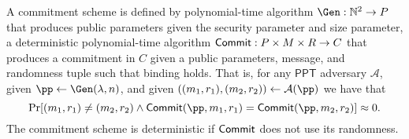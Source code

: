 \begin{definition}\label{def:commitment}
    A commitment scheme is defined by polynomial-time algorithm
    $\Gen : \mathbb{N}^2 \to P$
    that produces public parameters given the security parameter and size parameter, 
    a deterministic polynomial-time algorithm
    $\mathsf{Commit} : P \times M \times R \to C$
    that produces a commitment in $C$ given a public parameters, message, and randomness tuple
    such that 
    binding holds.
    That is, 
    for any $\mathsf{PPT}$ adversary $\mathcal{A}$,
    given
    $\pp \gets \Gen(\lambda, n)$,
    and given $((m_1, r_1), (m_2, r_2)) \gets \mathcal{A}(\pp)$
    we have that
    \[
        \Pr[(m_1, r_1) \neq (m_2, r_2) \land \Commit(\pp, m_1, r_1) = \Commit(\pp, m_2, r_2)] \approx 0.
    \]
    The commitment scheme is deterministic if $\mathsf{Commit}$ does not use its randomness. 
  \end{definition}